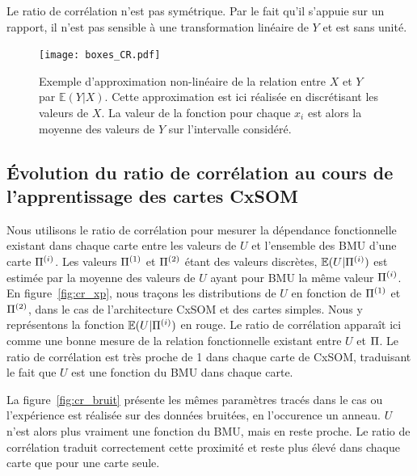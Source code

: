 \documentclass[../main]{subfiles}
\begin{document}
Le ratio de corrélation n'est pas symétrique. 
Par le fait qu'il s'appuie sur un rapport, il n'est pas sensible à une transformation linéaire de $Y$ et est sans unité.

\begin{figure}
    \centering
    \texttt{[image: boxes\_CR.pdf]}
    \caption{Exemple d'approximation non-linéaire de la relation entre $X$ et $Y$ par $\mathbb{E}(Y|X)$. Cette approximation est ici réalisée en discrétisant les valeurs de $X$. La valeur de la fonction pour chaque $x_i$ est alors la moyenne des valeurs de $Y$ sur l'intervalle considéré.\label{fig:cr_box}}
\end{figure}

\subsection{\'Evolution du ratio de corrélation au cours de l'apprentissage des cartes CxSOM}

Nous utilisons le ratio de corrélation pour mesurer la dépendance fonctionnelle existant dans chaque carte entre les valeurs de $U$ et l'ensemble des BMU d'une carte $\Pi^{({i})}$.
Les valeurs $\Pi^{({1})}$ et $\Pi^{({2})}$ étant des valeurs discrètes, $\mathbb{E}(U|\Pi^{({i})})$ est estimée par la moyenne des valeurs de $U$ ayant pour BMU la même valeur $\Pi^{({i})}$. 
En figure~\ref{fig:cr_xp}, nous traçons les distributions de $U$ en fonction de $\Pi^{({1})}$ et $\Pi^{({2})}$, dans le cas de l'architecture CxSOM et des cartes simples. Nous y représentons la fonction $\mathbb{E}(U|\Pi^{({i})})$ en rouge.
Le ratio de corrélation apparaît ici comme une bonne mesure de la relation fonctionnelle existant entre $U$ et $\Pi$. Le ratio de corrélation est très proche de 1 dans chaque carte de CxSOM, traduisant le fait que $U$ est une fonction du BMU dans chaque carte.

La figure~\ref{fig:cr_bruit} présente les mêmes paramètres tracés dans le cas ou l'expérience est réalisée sur des données bruitées, en l'occurence un anneau. $U$ n'est alors plus vraiment une fonction du BMU, mais en reste proche. 
Le ratio de corrélation traduit correctement cette proximité et reste plus élevé dans chaque carte que pour une carte seule.
\end{document}

